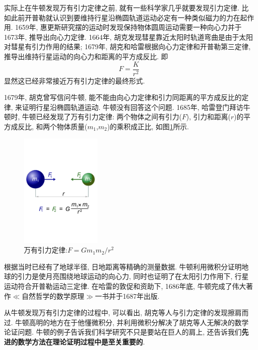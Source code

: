 \documentclass[11pt,a4paper,boxed]{caspset}
\begin{document}
实际上在牛顿发现万有引力定律之前, 就有一些科学家几乎就要发现引力定律.
 比如此前开普勒就认识到要维持行星沿椭圆轨道运动必定有一种类似磁力的力在起作用.
 1659年, 惠更斯研究摆的运动时发现保持物体圆周运动需要一种向心力并于1673年, 推导出向心力定律.
1664年, 胡克发现彗星靠近太阳时轨道弯曲是由于太阳对彗星有引力作用的结果; 1679年, 胡克和哈雷根据向心力定律和开普勒第三定律, 推导出维持行星运动的向心力和距离的平方成反比. 即
\[
F = \frac{K}{r^2}
\]
显然这已经非常接近万有引力定律的最终形式.

1679年, 胡克曾写信问牛顿, 能不能由向心力定律和引力同距离的平方成反比的定律, 来证明行星沿椭圆轨道运动. 牛顿没有回答这个问题. 1685年, 哈雷登门拜访牛顿时, 牛顿已经发现了万有引力定律: 两个物体之间有引力($F$), 引力和距离($r$)的平方成反比, 和两个物体质量($m_1$,$m_2$)的乘积成正比, 如图\ref{universalGravitation}所示.
\begin{figure}[!htb]
\centering
\includegraphics[width=0.35\textwidth]{./figures/universalGravitation.pdf}
\caption{\label{universalGravitation}万有引力定律:$F = Gm_1m_2/r^2$
}
\end{figure}

根据当时已经有了地球半径, 日地距离等精确的测量数据. 牛顿利用微积分证明地球的引力是使月亮围绕地球运动的向心力, 同时也证明了在太阳引力作用下, 行星运动符合开普勒运动三定律.
在哈雷的敦促和资助下, 1686年底, 牛顿完成了伟大著作$\ll$自然哲学的数学原理$\gg$一书并于1687年出版.

从牛顿发现万有引力定律的过程中, 可以看出, 胡克等人与引力定律的发现擦肩而过. 牛顿高明的地方在于他懂微积分, 并利用微积分解决了胡克等人无解决的数学论证问题.
牛顿的例子告诉我们科学研究不只是要站在巨人的肩上, 还告诉我们\textbf{先进的数学方法在理论证明过程中是至关重要的}.
\end{document}
